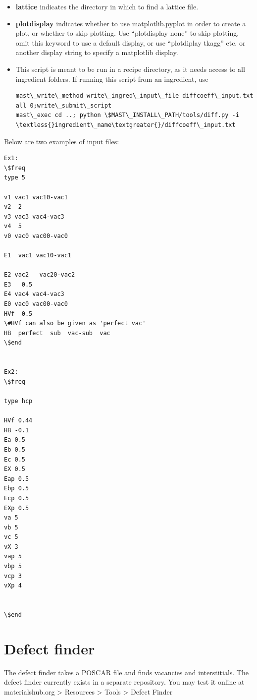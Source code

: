 \documentclass[letterpaper,10pt,english]{sphinxmanual}
\begin{document}
\begin{itemize}
\item {} 
\textbf{lattice} indicates the directory in which to find a lattice file.

\item {} 
\textbf{plotdisplay} indicates whether to use matplotlib.pyplot in order to create a plot, or whether to skip plotting. Use ``plotdisplay none'' to skip plotting, omit this keyword to use a default display, or use ``plotdiplay tkagg'' etc. or another display string to specify a matplotlib display.

\item {} 
This script is meant to be run in a recipe directory, as it needs access to all ingredient folders. If running this script from an ingredient, use

\begin{Verbatim}[commandchars=\\\{\}]
mast\_write\_method write\_ingred\_input\_file diffcoeff\_input.txt all 0;write\_submit\_script
mast\_exec cd ..; python \$MAST\_INSTALL\_PATH/tools/diff.py -i \textless{}ingredient\_name\textgreater{}/diffcoeff\_input.txt
\end{Verbatim}

\end{itemize}

Below are two examples of input files:

\begin{Verbatim}[commandchars=\\\{\}]
Ex1:
\$freq
type 5

v1 vac1 vac10-vac1
v2  2
v3 vac3 vac4-vac3
v4  5
v0 vac0 vac00-vac0

E1  vac1 vac10-vac1

E2 vac2   vac20-vac2
E3   0.5
E4 vac4 vac4-vac3
E0 vac0 vac00-vac0
HVf  0.5
\#HVf can also be given as 'perfect vac'
HB  perfect  sub  vac-sub  vac
\$end


Ex2:
\$freq

type hcp

HVf 0.44
HB -0.1
Ea 0.5
Eb 0.5
Ec 0.5
EX 0.5
Eap 0.5
Ebp 0.5
Ecp 0.5
EXp 0.5
va 5
vb 5
vc 5
vX 3
vap 5
vbp 5
vcp 3
vXp 4


\$end
\end{Verbatim}


\section{Defect finder}
\label{6_0_tools:defect-finder}
The defect finder takes a POSCAR file and finds vacancies and interstitials.
The defect finder currently exists in a separate repository.
You may test it online at materialshub.org \textgreater{} Resources \textgreater{} Tools \textgreater{} Defect Finder
\end{document}
